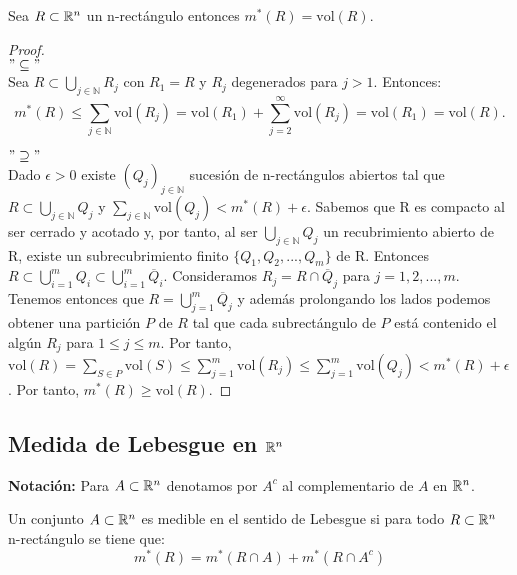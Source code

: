 \begin{proposición}
Sea $R \subset \mathbb{R}^n$ un n-rectángulo entonces $m^*(R) = \text{vol}(R)$.
\end{proposición}

\begin{proof}
    \leavevmode\\
    $"\subseteq "$\\
    Sea \( R \subset \bigcup_{j \in \mathbb{N}} R_j \) con \( R_1 = R \) y \( R_j \) degenerados para \( j > 1 \). Entonces:
    \[
        m^*(R) \leq \sum_{j \in \mathbb{N}} \text{vol}(R_j) = \text{vol}(R_1) + \sum_{j=2}^{\infty} \text{vol}(R_j) = \text{vol}(R_1) = \text{vol}(R).
    \]

    $"\supseteq"$\\
    Dado $\epsilon > 0$ existe $(Q_j)_{j \in \mathbb{N}}$ sucesión de n-rectángulos abiertos tal que $R \subset \bigcup_{j \in \mathbb{N}} Q_j$ y $\sum_{j \in \mathbb{N}} \text{vol}(Q_j) < m^*(R) + \epsilon$. Sabemos que R es compacto al ser cerrado y acotado y, por tanto, al ser $\bigcup_{j \in \mathbb{N}} Q_j$ un recubrimiento abierto de R, existe un subrecubrimiento finito $\{Q_1, Q_2, ..., Q_m\}$ de R. Entonces $R \subset \bigcup_{i=1}^m Q_i \subset \bigcup_{i = 1}^m \overline{Q}_i$. Consideramos $R_j = R \cap \overline{Q}_j$ para $j = 1, 2, ..., m$. Tenemos entonces que $R = \bigcup_{j = 1}^{m} \overline{Q}_j$ y además prolongando los lados podemos obtener una partición $P$ de $R$ tal que cada subrectángulo de $P$ está contenido el algún $R_j$ para $1 \leq j \leq m$. Por tanto, $\text{vol}(R) = \sum_{S \in P} \text{vol}(S) \leq \sum_{j = 1}^{m} \text{vol}(R_j) \leq \sum_{j = 1}^{m} \text{vol}(Q_j) < m^*(R) + \epsilon$. Por tanto, $m^*(R) \geq \text{vol}(R)$.
\end{proof}

\subsection{Medida de Lebesgue en $\mathbb{R}^n$}

\textbf{Notación:} Para $A \subset \mathbb{R}^n$ denotamos por $A^c$ al complementario de $A$ en $\mathbb{R}^n$.

\label{Conjunto Medible}
\begin{definición}
Un conjunto $A \subset \mathbb{R}^n$ es medible en el sentido de Lebesgue si para todo $R \subset \mathbb{R}^n$ n-rectángulo se tiene que:
\begin{equation}
    m^*(R) = m^*(R \cap A) + m^*(R \cap A^c)
\end{equation}
\end{definición}

